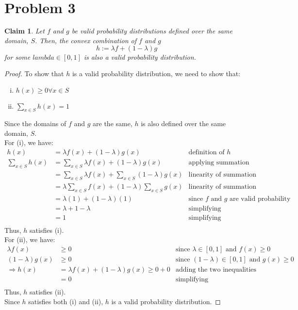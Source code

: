 \documentclass[11pt]{article}
\newtheorem*{claim}{Claim}
\begin{document}
\newpage

\section*{Problem 3}
\begin{claim}
	Let $f$ and $g$ be valid probability distributions defined over the same domain, $S$.
	Then, the convex combination of $f$ and $g$
	\[
		h := \lambda f + (1 - \lambda) g
	\]
	for some $lambda \in [0, 1]$ is also a valid probability distribution.
\end{claim}
\begin{proof}
	To show that $h$ is a valid probability distribution, we need to show that:
	\begin{enumerate}[(i)]
		\item $h(x) \geq 0 \forall x \in S$
		\item $\sum_{x \in S} h(x) = 1$
	\end{enumerate}
	Since the domains of $f$ and $g$ are the same, $h$ is also defined over the same domain, $S$. \\
	For (i), we have:
	\begin{align*}
		h(x) &= \lambda f(x) + (1 - \lambda) g(x) & \text{definition of } h \\
		\sum_{x \in S} h(x) &= \sum_{x \in S} \lambda f(x) + (1 - \lambda) g(x) & \text{applying summation} \\
		&= \sum_{x \in S} \lambda f(x) + \sum_{x \in S} (1 - \lambda) g(x) & \text{linearity of summation} \\
		&= \lambda \sum_{x \in S} f(x) + (1 - \lambda) \sum_{x \in S} g(x) & \text{linearity of summation} \\
		&= \lambda (1) + (1 - \lambda) (1) & \text{since } f \text{ and } g \text{ are valid probability distributions} \\
		&= \lambda + 1 - \lambda & \text{simplifying} \\
		&= 1 & \text{simplifying} \\
	\end{align*}
	Thus, $h$ satisfies (i). \\
	For (ii), we have:
	\begin{align*}
		\lambda f(x) & \geq 0 & \text{since } \lambda \in [0, 1] \text{ and } f(x) \geq 0 \\
		(1 - \lambda) g(x) & \geq 0 & \text{since } (1 - \lambda) \in [0, 1] \text{ and } g(x) \geq 0 \\
		\Rightarrow h(x) &= \lambda f(x) + (1 - \lambda) g(x) \geq 0 + 0 & \text{adding the two inequalities} \\
		&= 0 & \text{simplifying} \\
	\end{align*}
	Thus, $h$ satisfies (ii). \\
	Since $h$ satisfies both (i) and (ii), $h$ is a valid probability distribution.
\end{proof}
\end{document}
